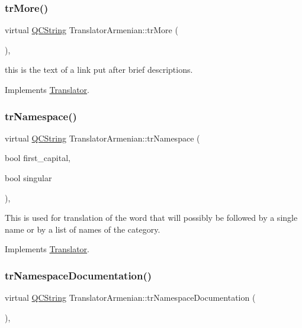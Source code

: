 \subsubsection{\texorpdfstring{trMore()}{trMore()}}
{\footnotesize\ttfamily virtual \mbox{\hyperlink{class_q_c_string}{Q\+C\+String}} Translator\+Armenian\+::tr\+More (\begin{DoxyParamCaption}{ }\end{DoxyParamCaption})\hspace{0.3cm}{\ttfamily [inline]}, {\ttfamily [virtual]}}

this is the text of a link put after brief descriptions. 

Implements \mbox{\hyperlink{class_translator}{Translator}}.

\mbox{\label{class_translator_armenian_a05bc60f49feee5ccee07bbecc8ae9d23}} 
\subsubsection{\texorpdfstring{trNamespace()}{trNamespace()}}
{\footnotesize\ttfamily virtual \mbox{\hyperlink{class_q_c_string}{Q\+C\+String}} Translator\+Armenian\+::tr\+Namespace (\begin{DoxyParamCaption}\item[{bool}]{first\+\_\+capital,  }\item[{bool}]{singular }\end{DoxyParamCaption})\hspace{0.3cm}{\ttfamily [inline]}, {\ttfamily [virtual]}}

This is used for translation of the word that will possibly be followed by a single name or by a list of names of the category. 

Implements \mbox{\hyperlink{class_translator}{Translator}}.

\mbox{\label{class_translator_armenian_a705fc51ab7fdee674c1fc84f94e0faff}} 
\subsubsection{\texorpdfstring{trNamespaceDocumentation()}{trNamespaceDocumentation()}}
{\footnotesize\ttfamily virtual \mbox{\hyperlink{class_q_c_string}{Q\+C\+String}} Translator\+Armenian\+::tr\+Namespace\+Documentation (\begin{DoxyParamCaption}{ }\end{DoxyParamCaption})\hspace{0.3cm}{\ttfamily [inline]}, {\ttfamily [virtual]}}

